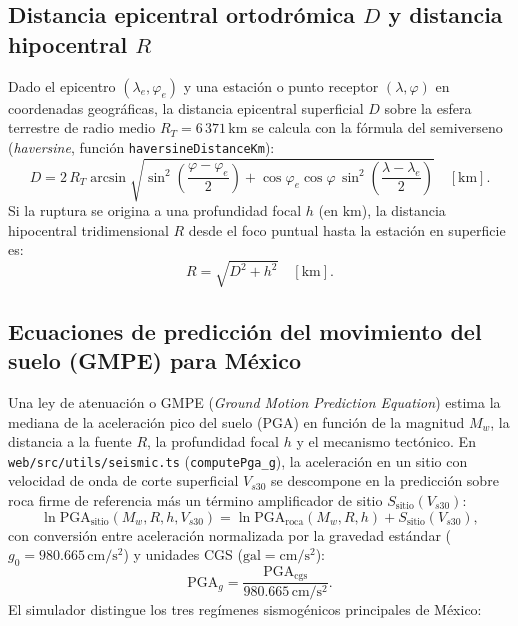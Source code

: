 \documentclass[11pt,a4paper]{article}
\newcommand{\src}[1]{\nolinkurl{#1}}
\newcommand{\unit}[1]{\mathrm{#1}}
\begin{document}
\subsection{Distancia epicentral ortodrómica \texorpdfstring{$D$}{D} y distancia hipocentral \texorpdfstring{$R$}{R}}
\label{sec:sismo-distancias}

Dado el epicentro $(\lambda_e,\varphi_e)$ y una estación o punto receptor $(\lambda,\varphi)$ en coordenadas
geográficas, la distancia epicentral superficial $D$ sobre la esfera terrestre de radio medio
$R_T = 6\,371\,\unit{km}$ se calcula con la fórmula del semiverseno (\emph{haversine}, función
\texttt{haversineDistanceKm}):
\begin{equation}
  D = 2\,R_T\arcsin\sqrt{
    \sin^2\!\left(\frac{\varphi - \varphi_e}{2}\right)
    + \cos\varphi_e\cos\varphi\,\sin^2\!\left(\frac{\lambda - \lambda_e}{2}\right)
  }\quad[\unit{km}].
  \label{eq:sismo-haversine}
\end{equation}
Si la ruptura se origina a una profundidad focal $h$ (en $\unit{km}$), la distancia hipocentral tridimensional
$R$ desde el foco puntual hasta la estación en superficie es:
\begin{equation}
  R = \sqrt{D^2 + h^2}\quad[\unit{km}].
  \label{eq:sismo-hipocentral}
\end{equation}

\subsection{Ecuaciones de predicción del movimiento del suelo (GMPE) para México}
\label{sec:sismo-modelos-gmpe}

Una ley de atenuación o GMPE (\emph{Ground Motion Prediction Equation}) estima la mediana de la aceleración pico
del suelo ($\mathrm{PGA}$) en función de la magnitud $M_w$, la distancia a la fuente $R$, la profundidad focal
$h$ y el mecanismo tectónico. En \src{web/src/utils/seismic.ts} (\texttt{computePga\_g}), la aceleración en un
sitio con velocidad de onda de corte superficial $V_{s30}$ se descompone en la predicción sobre roca firme de
referencia más un término amplificador de sitio $S_{\mathrm{sitio}}(V_{s30})$:
\begin{equation}
  \ln\mathrm{PGA}_{\mathrm{sitio}}(M_w,R,h,V_{s30})
  = \ln\mathrm{PGA}_{\mathrm{roca}}(M_w,R,h) + S_{\mathrm{sitio}}(V_{s30}),
  \label{eq:gmpe-general}
\end{equation}
con conversión entre aceleración normalizada por la gravedad estándar ($g_0 = 980.665\,\unit{cm/s^2}$) y
unidades CGS ($\unit{gal} = \unit{cm/s^2}$):
\begin{equation}
  \mathrm{PGA}_{g} = \frac{\mathrm{PGA}_{\mathrm{cgs}}}{980.665\,\unit{cm/s^2}}.
\end{equation}
El simulador distingue los tres regímenes sismogénicos principales de México:
\end{document}
